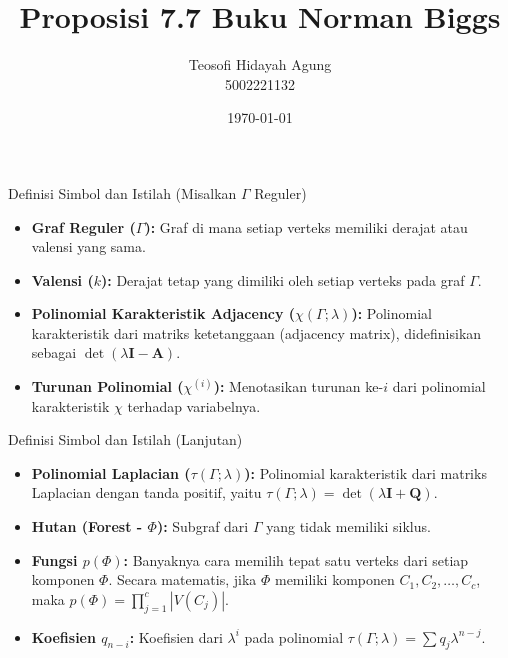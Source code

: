 ﻿\documentclass[aspectratio=169]{beamer}
\date{\today}
\title[Aljabar Graf]{Proposisi 7.7 Buku Norman Biggs}
\author[Teosofi H.\ A.]{Teosofi Hidayah Agung \\ 5002221132}
\institute[Matematika ITS]{Departemen Matematika\\ Institut Teknologi Sepuluh Nopember}
\begin{document}
\frame{\titlepage}

\begin{frame}{Definisi Simbol dan Istilah (Misalkan $\Gamma$ Reguler)}
  \begin{itemize}
    \item \textbf{Graf Reguler ($\Gamma$):} Graf di mana setiap verteks memiliki derajat atau valensi yang sama.
    \item \textbf{Valensi ($k$):} Derajat tetap yang dimiliki oleh setiap verteks pada graf $\Gamma$.
    \item \textbf{Polinomial Karakteristik Adjacency ($\chi(\Gamma; \lambda)$):} Polinomial karakteristik dari matriks ketetanggaan (adjacency matrix), didefinisikan sebagai $\det(\lambda \mathbf{I} - \mathbf{A})$.
    \item \textbf{Turunan Polinomial ($\chi^{(i)}$):} Menotasikan turunan ke-$i$ dari polinomial karakteristik $\chi$ terhadap variabelnya.
  \end{itemize}
\end{frame}

\begin{frame}{Definisi Simbol dan Istilah (Lanjutan)}
  \begin{itemize}
    \item \textbf{Polinomial Laplacian ($\tau(\Gamma; \lambda)$):} Polinomial karakteristik dari matriks Laplacian dengan tanda positif, yaitu $\tau(\Gamma; \lambda) = \det(\lambda \mathbf{I} + \mathbf{Q})$.
    \item \textbf{Hutan (Forest - $\Phi$):} Subgraf dari $\Gamma$ yang tidak memiliki siklus.
    \item \textbf{Fungsi $p(\Phi)$:} Banyaknya cara memilih tepat satu verteks dari setiap komponen $\Phi$. Secara matematis, jika $\Phi$ memiliki komponen $C_1, C_2, \dots, C_c$, maka $p(\Phi) = \prod_{j=1}^c |V(C_j)|$.
    \item \textbf{Koefisien $q_{n-i}$:} Koefisien dari $\lambda^i$ pada polinomial $\tau(\Gamma; \lambda) = \sum q_j \lambda^{n-j}$.
  \end{itemize}
\end{frame}
\end{document}
